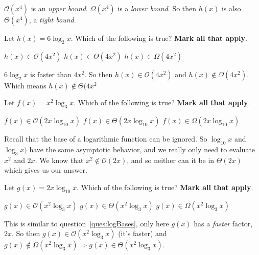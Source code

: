 \documentclass{exam}
\begin{document}
\begin{questions}
\begin{solution}
        $\mathcal{O}(x^{4})$ is an \textit{upper bound}.
        $\Omega(x^{4})$ is a \textit{lower bound}.
        So then $h(x)$ is also $\Theta(x^{4})$, a \textit{tight bound}.
    \end{solution}


\question Let $h(x)=6\log_{2}x$. Which of the following is true? \textbf{Mark all that apply}. 

    \begin{oneparcheckboxes}
        \CorrectChoice $h(x)\in \mathcal{O}(4x^{2})$
        \choice $h(x)\in \Theta(4x^{2})$
        \choice $h(x)\in \Omega(4x^{2})$
    \end{oneparcheckboxes}
    \begin{solution}
        $6\log_{2}x$ is faster than $4x^{2}$. So then $h(x)\in \mathcal{O}(4x^{2})$ and $h(x) \notin \Omega(4x^{2})$. Which means $h(x) \notin \Theta(4x^{2}$
    \end{solution}


\question Let $f(x)=x^{2}\log_{3}x$. Which of the following is true? \textbf{Mark all that apply}.
\label{ques:logBases}

    \begin{oneparcheckboxes}
        \choice $f(x)\in \mathcal{O}(2x\log_{10}x)$
        \choice $f(x)\in \Theta(2x\log_{10}x)$
        \CorrectChoice $f(x)\in \Omega(2x\log_{10}x)$
    \end{oneparcheckboxes}
    \begin{solution}
       Recall that the base of a logarithmic function can be ignored. So $\log_{10}x$ and $\log_{3}x)$ have the same asymptotic behavior, and we really only need to evaluate $x^{2}$ and $2x$. We know that $x^{2}\notin \mathcal{O}(2x)$, and so neither can it be in $\Theta(2x)$ which gives us our answer.
    \end{solution}


\question Let $g(x)=2x\log_{10}x$. Which of the following is true? \textbf{Mark all that apply}. 

    \begin{oneparcheckboxes}
        \CorrectChoice $g(x)\in \mathcal{O}(x^{2}\log_{3}x)$
        \choice $g(x)\in \Theta(x^{2}\log_{3}x)$
        \choice $g(x)\in \Omega(x^{2}\log_{3}x)$
    \end{oneparcheckboxes}
    
    \begin{solution}
        This is similar to question~\ref{ques:logBases}, only here $g(x)$ has a \textit{faster} factor, $2x$. So then $g(x)\in \mathcal{O}(x^{2}\log_{3}x)$ (it's faster) and $g(x)\notin \Omega(x^{2}\log_{3}x)\Rightarrow g(x)\in \Theta(x^{2}\log_{3}x)$.
    \end{solution}


\end{questions}
\end{document}

